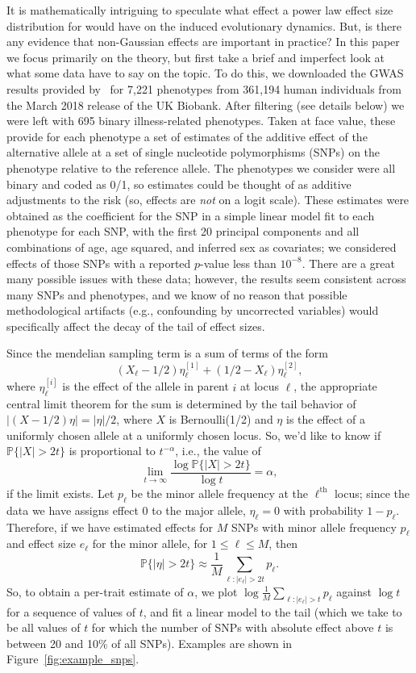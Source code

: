 \documentclass{article}
\renewcommand{\P}{\mathbb{P}}
\newcommand{\1}{\mathbbm{1}}
\theoremstyle{remark}
\theoremstyle{definition}
\begin{document}
It is mathematically intriguing to speculate what effect a power law effect size distribution
for would have on the induced evolutionary dynamics.
But, is there any evidence that non-Gaussian effects are important in practice?
In this paper we focus primarily on the theory,
but first take a brief and imperfect look at what some data have to say on the topic.
To do this, we downloaded the GWAS results provided by~\citet{biobankSNPs}
for 7,221 phenotypes from 361,194 human individuals from the March 2018 release of the UK Biobank.
After filtering (see details below) we were left with 695 binary illness-related phenotypes.
Taken at face value, these provide for each phenotype a set of estimates of the additive effect
of the alternative allele at a set of single nucleotide polymorphisms (SNPs)
on the phenotype relative to the reference allele.
The phenotypes we consider were all binary and coded as 0/1,
so estimates could be thought of as additive adjustments to the risk
(so, effects are \emph{not} on a logit scale).
These estimates were obtained as the coefficient for the SNP in a simple linear model
fit to each phenotype for each SNP,
with the first 20 principal components and all combinations of age, age squared, and inferred sex as covariates;
we considered effects of those SNPs with a reported $p$-value less than $10^{-8}$.
There are a great many possible issues with these data;
however, the results seem consistent across many SNPs and phenotypes,
and we know of no reason that possible methodological artifacts
(e.g., confounding by uncorrected variables)
would specifically affect the decay of the tail of effect sizes.

Since the mendelian sampling term is a sum of terms of the form
$$
    (X_\ell - 1/2) \eta_\ell^{[1]} + (1/2 - X_\ell) \eta_\ell^{[2]},
$$
where $\eta_\ell^{[i]}$ is the effect of the allele in parent $i$ at locus $\ell$,
the appropriate central limit theorem for the sum is determined by
the tail behavior of $|(X - 1/2) \eta| = |\eta|/2$,
where $X$ is Bernoulli(1/2) and $\eta$ is the effect
of a uniformly chosen allele at a uniformly chosen locus.
So, we'd like to know
if $\P\{|X|>2t\}$ is proportional to $t^{-\alpha}$,
i.e., the value of
$$
    \lim_{t \to \infty} \frac{ \log \P\{ |X| > 2 t \} }{ \log t } = \alpha ,
$$
if the limit exists.
Let $p_\ell$ be the minor allele frequency at the $\ell^\text{th}$ locus;
since the data we have assigns effect 0 to the major allele,
$\eta_\ell = 0$ with probability $1-p_\ell$.
Therefore, if we have estimated effects for $M$ SNPs
with minor allele frequency $p_\ell$ and effect size $e_\ell$ for the minor allele,
for $1 \le \ell \le M$,
then
$$
    \P\{ |\eta| > 2t \} \approx \frac{1}{M} \sum_{\ell : |e_\ell| > 2t} p_\ell .
$$
So, to obtain a per-trait estimate of $\alpha$,
we plot $\log \frac{1}{M} \sum_{\ell : |e_\ell| > t} p_\ell$ against $\log t$
for a sequence of values of $t$,
and fit a linear model to the tail
(which we take to be all values of $t$ for which the number of SNPs with absolute effect above $t$
is between 20 and 10\% of all SNPs).
Examples are shown in Figure~\ref{fig:example_snps}.
\end{document}
